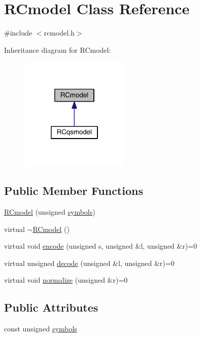 \hypertarget{class_r_cmodel}{}\section{R\+Cmodel Class Reference}
\label{class_r_cmodel}


{\ttfamily \#include $<$rcmodel.\+h$>$}



Inheritance diagram for R\+Cmodel\+:\nopagebreak
\begin{figure}[H]
\begin{center}
\leavevmode
\includegraphics[width=148pt]{dc/d71/class_r_cmodel__inherit__graph}
\end{center}
\end{figure}
\subsection*{Public Member Functions}
\begin{DoxyCompactItemize}
\item 
\hyperlink{class_r_cmodel_a9e675517b2d8de3fe6eb5e7bd4f675e7}{R\+Cmodel} (unsigned \hyperlink{class_r_cmodel_a5e290a4368ad3694ed1457cd06636241}{symbols})
\item 
virtual \hyperlink{class_r_cmodel_a12a00c2d544d60c9d8253f89056e1ce6}{$\sim$\+R\+Cmodel} ()
\item 
virtual void \hyperlink{class_r_cmodel_ab24347c694eec05a64fa86893f100a45}{encode} (unsigned s, unsigned \&l, unsigned \&r)=0
\item 
virtual unsigned \hyperlink{class_r_cmodel_a97b99efb9568ccfe338e3f9811c50a13}{decode} (unsigned \&l, unsigned \&r)=0
\item 
virtual void \hyperlink{class_r_cmodel_aea217566337926993225573e6d3d26b7}{normalize} (unsigned \&r)=0
\end{DoxyCompactItemize}
\subsection*{Public Attributes}
\begin{DoxyCompactItemize}
\item 
const unsigned \hyperlink{class_r_cmodel_a5e290a4368ad3694ed1457cd06636241}{symbols}
\end{DoxyCompactItemize}


